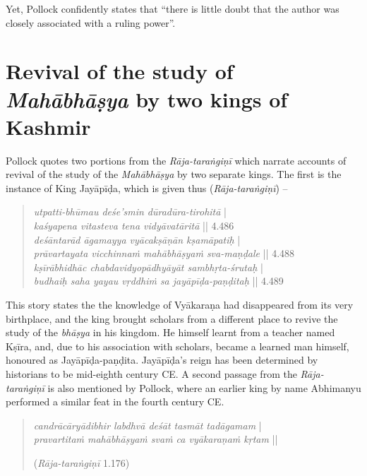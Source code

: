 Yet, Pollock confidently states that ``there is little doubt that the author was closely associated with a ruling power''. 

\section{Revival of the study of {{\sl\bfseries Mahābhāṣya}} by two kings of Kashmir}\label{chap3-sec12}

Pollock quotes two portions from the {\sl Rāja-taraṅgiṇī} which narrate accounts of revival of the study of the {\sl Mahābhāṣya} by two separate kings. The first is the instance of King Jayāpīḍa,  which is given thus ({\sl Rāja-taraṅgiṇī}) --
\begin{quote}
{{\sl utpatti-bhūmau deśe’smin dūradūra-tirohitā}} |\\[2pt]
{{\sl kaśyapena vitasteva tena vidyāvatāritā}} || 4.486\\[2pt]
{{\sl deśāntarād āgamayya vyācakṣāṇān kṣamāpatiḥ}} |\\[2pt] 
{{\sl prāvartayata vicchinnaṁ mahābhāṣyaṁ sva-maṇḍale}} || 4.488\\[2pt]
{{\sl kṣīrābhidhāc chabdavidyopādhyāyāt sambhṛta-śrutaḥ}} |\\[2pt]
{{\sl budhaiḥ saha yayau vṛddhiṁ sa jayāpīḍa-paṇḍitaḥ}} || 4.489  
\end{quote}
This story states the the knowledge of Vyākaraṇa had disappeared from its very birthplace, and the king brought scholars from a different place to revive the study of the {\sl bhāṣya} in his kingdom. He himself learnt from a teacher named Kṣīra, and, due to his association with scholars, became a learned man himself, honoured as Jayāpīḍa-paṇḍita. Jayāpīḍa's reign has been determined by historians to be mid-eighth century CE. A second passage from the {\sl Rāja-taraṅgiṇī} is also mentioned by Pollock, where an earlier king by name Abhimanyu performed a similar feat in the fourth century CE.
\begin{quote}
{{\sl candrācāryādibhir labdhvā deśāt tasmāt tadāgamam}} |\\ 
{{\sl pravartitaṁ mahābhāṣyaṁ svaṁ ca vyākaraṇaṁ kṛtam}} || 

\hfill ({\sl Rāja-taraṅgiṇī} 1.176)
\end{quote}
